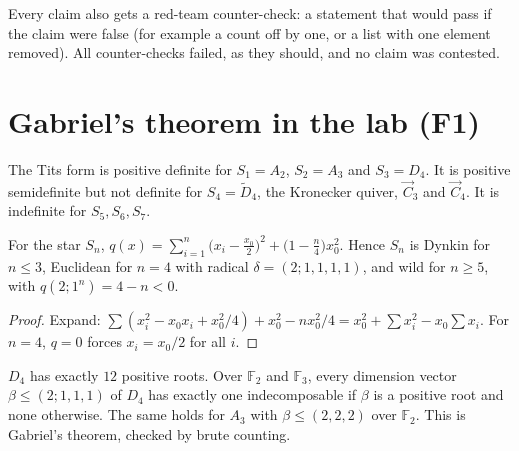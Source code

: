 \documentclass[11pt]{article}
\theoremstyle{definition}\newtheorem{definition}[theorem]{Definition}\newtheorem{remark}[theorem]{Remark}\newtheorem{observation}[theorem]{Numerical observation}
\newcommand{\C}[1]{\texttt{[C-#1]}}
\begin{document}
Every claim also gets a red-team counter-check: a statement that would pass if the claim were false (for example a count off by one, or a list
with one element removed). All counter-checks failed, as they should, and no claim was contested.

\section{Gabriel's theorem in the lab (F1)}
\begin{proposition}[Verified \C{quivers-R1-1}--\C{quivers-R1-10}]
The Tits form is positive definite for $S_1=A_2$, $S_2=A_3$ and $S_3=D_4$. It is positive semidefinite but not definite for $S_4=\widetilde D_4$, the Kronecker quiver,
$\vec C_3$ and $\vec C_4$. It is indefinite for $S_5,S_6,S_7$.
\end{proposition}
\begin{proposition}[Proof]\label{prop:starform}
For the star $S_n$, $q(x)=\sum_{i=1}^n\big(x_i-\tfrac{x_0}{2}\big)^2+\big(1-\tfrac n4\big)x_0^2$. Hence $S_n$ is Dynkin for $n\le3$, Euclidean for $n=4$
with radical $\delta=(2;1,1,1,1)$, and wild for $n\ge5$, with $q(2;1^n)=4-n<0$.
\end{proposition}
\begin{proof}
Expand: $\sum(x_i^2-x_0x_i+x_0^2/4)+x_0^2-nx_0^2/4=x_0^2+\sum x_i^2-x_0\sum x_i$. For $n=4$, $q=0$ forces $x_i=x_0/2$ for all $i$.
\end{proof}
\begin{proposition}[Verified \C{quivers-R1-11}--\C{quivers-R1-14}]
$D_4$ has exactly $12$ positive roots. Over $\mathbb F_2$ and $\mathbb F_3$, every dimension vector $\beta\le(2;1,1,1)$ of $D_4$ has exactly one
indecomposable if $\beta$ is a positive root and none otherwise. The same holds for $A_3$ with $\beta\le(2,2,2)$ over $\mathbb F_2$.
This is Gabriel's theorem, checked by brute counting.
\end{proposition}
\end{document}
